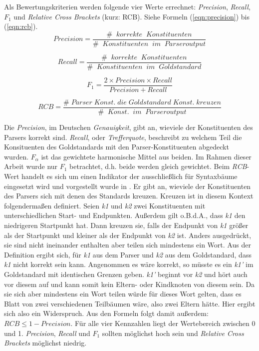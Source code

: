 Als Bewertungskriterien werden folgende vier Werte errechnet: \textit{Precision}, \textit{Recall}, \(F_1\) und \textit{Relative Cross Brackets} (kurz: RCB). Siehe Formeln (\ref{eqn:precision}) bis (\ref{eqn:rcb}). \\ 
\begin{equation}
Precision = \frac{\# \;\; korrekte \;\; Konstituenten}{ \# \;\; Konstituenten \;\; im \;\; Parseroutput}
\label{eqn:precision}
\end{equation}

\begin{equation}
Recall = \frac{\# \;\; korrekte \;\; Konstituenten}{ \# \;\; Konstituenten \;\; im \;\; Goldstandard}
\end{equation}

\begin{equation}
F_1 = \frac{2 \times Precision \times Recall}{ Precision + Recall}
\end{equation}

\begin{equation}
RCB = \frac{\# \; Parser \; Konst. \; die \; Goldstandard \; Konst. \; kreuzen}{ \# \;\; Konst. \;\; im \;\; Parseroutput}
\label{eqn:rcb}
\end{equation}

Die \textit{Precision}, im Deutschen \textit{Genauigkeit}, gibt an, wieviele der Konstituenten des Parsers korrekt sind. \textit{Recall}, oder \textit{Trefferquote}, beschreibt zu welchem Teil die Konsituenten des Goldstandards mit den Parser-Konstituenten abgedeckt wurden. \(F_\alpha\) ist das gewichtete harmonische Mittel aus beiden. Im Rahmen dieser Arbeit wurde nur \(F_1\) betrachtet, d.h. beide werden gleich gewichtet. Beim \textit{RCB}-Wert handelt es sich um einen Indikator der ausschließlich für Syntaxbäume eingesetzt wird und vorgestellt wurde in \cite{crossbrackets}. Er gibt an, wieviele der Konstituenten des Parsers sich mit denen des Standards kreuzen. Kreuzen ist in diesem Kontext folgendermaßen definiert. Seien \textit{k1} und \textit{k2} zwei Konstituenten mit unterschiedlichen Start- und Endpunkten. Außerdem gilt o.B.d.A., dass \textit{k1} den niedrigeren Startpunkt hat. Dann kreuzen sie, falls der Endpunkt von \textit{k1} größer als der Startpunkt und kleiner als der Endpunkt von \textit{k2} ist. Anders ausgedrückt, sie sind nicht ineinander enthalten aber teilen sich mindestens ein Wort. %
Aus der Definition ergibt sich, für \textit{k1} aus dem Parser und \textit{k2} aus dem Goldstandard, dass \textit{k1} nicht korrekt sein kann. Angenommen es wäre korrekt, so müsste es ein \textit{k1'} im Goldstandard mit identischen Grenzen geben. \textit{k1'} beginnt vor \textit{k2} und hört auch vor diesem auf und kann somit kein Eltern- oder Kindknoten von diesem sein. Da sie sich aber mindestens ein Wort teilen würde für dieses Wort gelten, dass es Blatt von zwei verschiedenen Teilbäumen wäre, also zwei Eltern hätte. Hier ergibt sich also ein Widerspruch. Aus den Formeln folgt damit außerdem: \( RCB \leq 1 - Precision \). Für alle vier Kennzahlen liegt der Wertebereich zwischen 0 und 1. \textit{Precision}, \textit{Recall} und \(F_1\) sollten möglichst hoch sein und \textit{Relative Cross Brackets} möglichst niedrig.